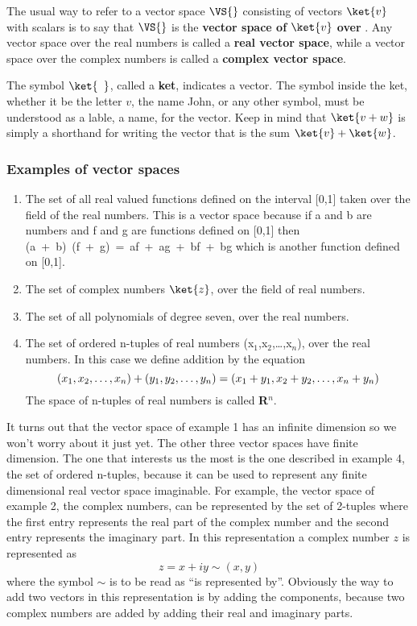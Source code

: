 The usual way to refer to a vector space $\VS{}$ consisting of vectors $\ket{v}$ with scalars  is to say that $\VS{}$ is the \textbf{vector space of $\ket{v}$ over }.
Any vector space over the real numbers is called a \textbf{real vector space}, while a vector space over the complex numbers is called a \textbf{complex vector space}.

The symbol $\ket{\phantom{v}}$, called a \textbf{ket}, indicates a vector.
The symbol inside the ket, whether it be the letter $v$, the name John, or any other symbol, must be understood as a lable, a name, for the vector.
Keep in mind that $\ket{v+w}$ is simply a shorthand for writing the vector that is the sum $\ket{v} + \ket{w}$.

\subsubsection{Examples of vector spaces}
\begin{enumerate}
\item The set of all real valued functions defined on the interval [0,1] taken over the field of the real numbers.  This is a vector space because if a and b are numbers and f and g are functions defined on [0,1] then \mbox{(a + b) (f + g) = af + ag + bf + bg} which is another function defined on [0,1].
\item The set of complex numbers $\ket{z}$, over the field of real numbers.
\item The set of all polynomials of degree seven, over the real numbers.
\item The set of ordered n-tuples of real numbers (x$_{1}$,x$_{2}$,\ldots ,x$_{n}$), over the real numbers.
In this case we define addition by the equation
\begin{equation}
(x_{1},x_{2},\ldots ,x_{n}) + (y_{1},y_{2},\ldots ,y_{n}) = (x_{1}+y_{1},x_{2}+y_{2},\ldots ,x_{n}+y_{n})\\
\end{equation}
The space of n-tuples of real numbers is called \textbf{R}$^{n}$.
\end{enumerate}

It turns out that the vector space of example 1 has an infinite dimension so we won't worry about it just yet.
The other three vector spaces have finite dimension.
The one that interests us the most is the one described in example 4, the set of ordered n-tuples, because it can be used to represent any finite dimensional real vector space imaginable.
For example, the vector space of example 2, the complex numbers, can be represented by the set of 2-tuples where the first entry represents the real part of the complex number and the second entry represents the imaginary part.
In this representation a complex number $z$ is represented as
\begin{equation}
z = x + iy \sim (x,y)
\end{equation}
where the symbol $\sim$ is to be read as ``is represented by''.
Obviously the way to add two vectors in this representation is by adding the components, because two complex numbers are added by adding their real and imaginary parts.

